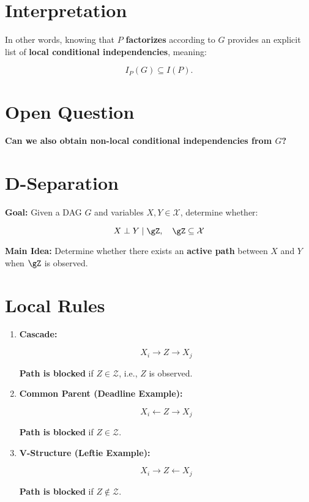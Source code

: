 \documentclass{article}%
\begin{document}
\section*{Interpretation}
In other words, knowing that \( P \) \textbf{factorizes} according to \( G \) provides an explicit list of \textbf{local conditional independencies}, meaning:

\[
I_P(G) \subseteq I(P).
\]

\section*{Open Question}
\textbf{Can we also obtain non-local conditional independencies from \( G \)?}


\section*{D-Separation}
\textbf{Goal:} Given a DAG \( G \) and variables \( X, Y \in \mathcal{X} \), determine whether:

\[
X \perp Y \mid \gZ, \quad \gZ \subseteq \mathcal{X}
\]

\textbf{Main Idea:} Determine whether there exists an \textbf{active path} between \( X \) and \( Y \) when \( \gZ \) is observed.

\section*{Local Rules}
\begin{enumerate}
    \item \textbf{Cascade:}
    
    \[
    X_i \to Z \to X_j
    \]

    \textbf{Path is blocked} if \( Z \in \mathcal{Z} \), i.e., \( Z \) is observed.

    \item \textbf{Common Parent (Deadline Example):}
    
    \[
    X_i \leftarrow Z \rightarrow X_j
    \]

    \textbf{Path is blocked} if \( Z \in \mathcal{Z} \).

    \item \textbf{V-Structure (Leftie Example):}
    
    \[
    X_i \to Z \leftarrow X_j
    \]

    \textbf{Path is blocked} if \( Z \notin \mathcal{Z} \).
\end{enumerate}
\end{document}
